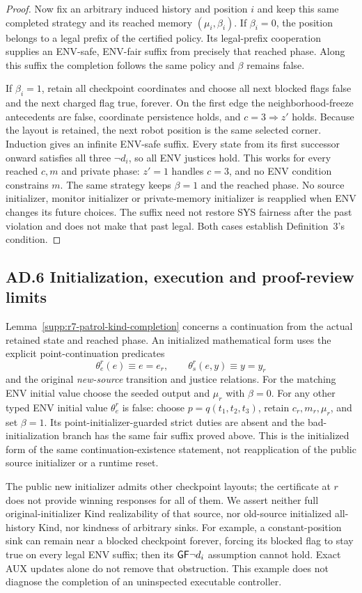 \begin{proof}
Now fix an arbitrary induced history and position $i$ and keep this same
completed strategy and its reached memory $(\mu_i,\beta_i)$.
If $\beta_i=0$, the position belongs to a legal prefix of the certified policy.
Its legal-prefix cooperation supplies an ENV-safe, ENV-fair suffix from
precisely that reached phase. Along this suffix the completion follows the
same policy and $\beta$ remains false.

If $\beta_i=1$, retain all checkpoint coordinates and choose all next blocked
flags false and the next charged flag true, forever.
On the first edge the neighborhood-freeze antecedents are false,
coordinate persistence holds, and $c=3\Rightarrow z'$ holds.
Because the layout is retained, the next robot position is the same selected
corner. Induction gives an infinite ENV-safe suffix.
Every state from its first successor onward satisfies all three $\neg d_i$,
so all ENV justices hold. This works for every reached $c,m$ and private
phase: $z'=1$ handles $c=3$, and no ENV condition constrains $m$.
The same strategy keeps $\beta=1$ and the reached phase.
No source initializer, monitor initializer or private-memory initializer
is reapplied when ENV changes its future choices. The suffix need not restore
SYS fairness after the past violation and does not make that past legal.
Both cases establish Definition~3's condition.
\end{proof}

\subsection*{AD.6 Initialization, execution and proof-review limits}
\label{supp:r7-patrol-kind-limits}
Lemma~\ref{supp:r7-patrol-kind-completion} concerns a continuation from the
actual retained state and reached phase. An initialized mathematical form uses
the explicit point-continuation predicates
\[
 \theta_e^r(e)\equiv e=e_r,\qquad
 \theta_s^r(e,y)\equiv y=y_r
\]
and the original \emph{new-source} transition and justice relations.
For the matching ENV initial value choose the seeded output and $\mu_r$
with $\beta=0$.
For any other typed ENV initial value $\theta_e^r$ is false: choose
$p=q(t_1,t_2,t_3)$, retain $c_r,m_r,\mu_r$, and set $\beta=1$.
Its point-initializer-guarded strict duties are absent and the bad-initialization
branch has the same fair suffix proved above.
This is the initialized form of the same continuation-existence statement,
not reapplication of the public source initializer or a runtime reset.

The public new initializer admits other checkpoint layouts; the certificate
at $r$ does not provide winning responses for all of them.
We assert neither full original-initializer Kind realizability of that source,
nor old-source initialized all-history Kind, nor kindness of arbitrary sinks.
For example, a constant-position sink can remain near a blocked checkpoint
forever, forcing its blocked flag to stay true on every legal ENV suffix;
then its $\mathsf{G}\mathsf{F}\neg d_i$ assumption cannot hold. Exact AUX updates alone do
not remove that obstruction. This example does not diagnose the completion
of an uninspected executable controller.

